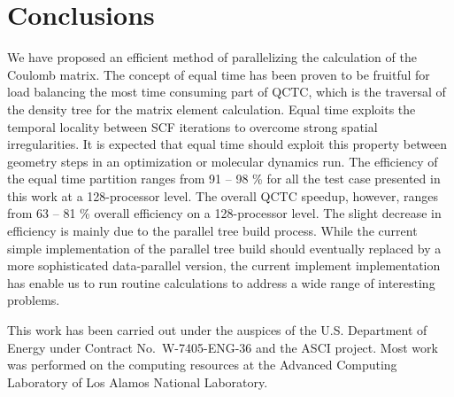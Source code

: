 \commentoutA{\documentclass[prl,aps,twocolumn,twocolumngrid,superbib]{revtex4}}
\begin{document}
\section{Conclusions}
\label{conclusions}
We have proposed an efficient method of parallelizing the calculation
of the Coulomb matrix. The concept of equal time has been proven to be
fruitful for load balancing the most time consuming part of QCTC,
which is the traversal of the density tree for the matrix element
calculation. 
Equal time exploits the temporal locality between SCF iterations 
to overcome strong spatial irregularities. It is expected that equal
time should exploit this property between geometry steps in an
optimization or molecular dynamics run.
The efficiency of the equal time partition ranges from 91
-- 98 \% for all the test case presented in this work at a
128-processor level. The overall QCTC speedup, however, ranges from 63
-- 81 \% overall efficiency on a 128-processor level. The slight
decrease in efficiency is mainly due to the parallel tree build
process.  While the current simple implementation of the parallel tree
build should eventually replaced by a more sophisticated data-parallel
version, the current implement implementation has enable us to run
routine calculations to address a wide range of interesting problems.

\begin{acknowledgments}
This work has been carried out under the auspices of the
U.S. Department of Energy under Contract No.~W-7405-ENG-36 and the
ASCI project.  Most work was performed on the computing resources at
the Advanced Computing Laboratory of Los Alamos National Laboratory.
\end{acknowledgments}

 
\end{document}
